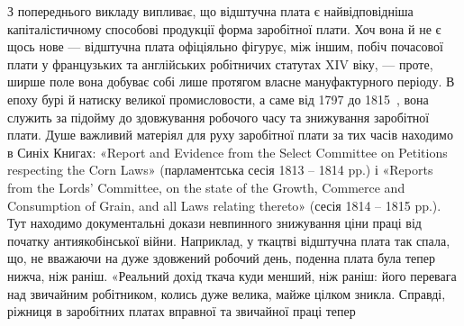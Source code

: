 З попереднього викладу випливає, що відштучна плата є найвідповідніша
капіталістичному способові продукції форма заробітної
плати. Хоч вона й не є щось нове — відштучна плата офіціяльно
фігурує, між іншим, побіч почасової плати у французьких
та англійських робітничих статутах XIV віку, — проте, ширше
поле вона добуває собі лише протягом власне мануфактурного
періоду. В епоху бурі й натиску великої промисловости, а саме
від 1797 до 1815~, вона служить за підойму до здовжування
робочого часу та знижування заробітної плати. Душе важливий
матеріял для руху заробітної плати за тих часів находимо в
Синіх Книгах: «Report and Evidence from the Select Committee
on Petitions respecting the Corn Laws» (парламентська сесія
1813 -- 1814 pp.) і «Reports from the Lords’ Committee, on the
state of the Growth, Commerce and Consumption of Grain, and
all Laws relating thereto» (сесія 1814 -- 1815 pp.). Тут находимо
документальні докази невпинного знижування ціни праці від
початку антиякобінської війни. Наприклад, у ткацтві відштучна
плата так спала, що, не вважаючи на дуже здовжений робочий
день, поденна плата була тепер нижча, ніж раніш. «Реальний дохід
ткача куди менший, ніж раніш: його перевага над звичайним
робітником, колись дуже велика, майже цілком зникла. Справді,
ріжниця в заробітних платах вправної та звичайної праці тепер

\parbreak{}  %
